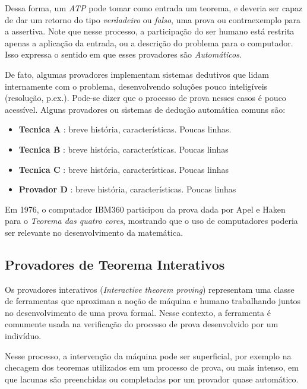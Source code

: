 Dessa forma, um \textit{ATP} pode tomar como entrada um teorema, e deveria ser capaz de dar um retorno do tipo \textit{verdadeiro} ou \textit{falso}, uma prova ou contraexemplo para a assertiva.
Note que nesse processo, a participação do ser humano está restrita apenas a aplicação da entrada, ou a descrição do problema para o computador.
Isso expressa o sentido em que esses provadores são \textit{Automáticos}.

De fato, algumas provadores implementam sistemas dedutivos que lidam internamente com o problema, desenvolvendo soluções pouco inteligíveis (resolução, p.ex.).
Pode-se dizer que o processo de prova nesses casos é pouco acessível.
Alguns provadores ou sistemas de dedução automática comuns são:

\begin{itemize}
    \item \textbf{Tecnica A} : breve história, características. Poucas linhas.
    \item \textbf{Tecnica B} : breve história, características. Poucas linhas
    \item \textbf{Tecnica C} : breve história, características. Poucas linhas
    \item \textbf{Provador D} : breve história, características. Poucas linhas
\end{itemize}

Em 1976, o computador IBM360 participou da prova dada por Apel e Haken para o \textit{Teorema das quatro cores}, mostrando que o uso de computadores poderia ser relevante no desenvolvimento da matemática.

\subsection{Provadores de Teorema Interativos}

Os provadores interativos (\textit{Interactive theorem proving}) representam uma classe de ferramentas que aproximan a noção de máquina e humano trabalhando juntos no desenvolvimento de uma prova formal.
Nesse contexto, a ferramenta é comumente usada na verificação do processo de prova desenvolvido por um indivíduo.

Nesse processo, a intervenção da máquina pode ser superficial, por exemplo na checagem dos teoremas utilizados em um processo de prova, ou mais intenso, em que lacunas são preenchidas ou completadas por um provador quase automático.

